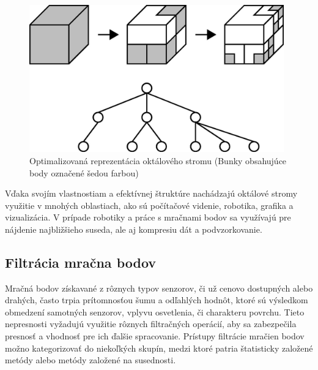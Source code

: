 \newline\begin{figure}[!htbp]
  \centering
  \includegraphics[width=11cm]{img/oct_tree_part.jpg}
  \caption{Optimalizovaná reprezentácia oktálového stromu (Bunky obsahujúce body označené šedou farbou) \cite{oct_tree}}
  \label{oct_tree2}
\end{figure}
\newline\indent Vďaka svojím vlastnostiam a efektívnej štruktúre nachádzajú oktálové stromy využitie v mnohých oblastiach, ako sú počítačové videnie, robotika, grafika a vizualizácia. V prípade robotiky a práce s mračnami bodov sa využívajú pre nájdenie najbližšieho suseda, ale aj kompresiu dát a podvzorkovanie.

\subsection{Filtrácia mračna bodov}
\noindent Mračná bodov získavané z rôznych typov senzorov, či už cenovo dostupných alebo drahých, často trpia prítomnosťou šumu a odľahlých hodnôt, ktoré sú výsledkom obmedzení samotných senzorov, vplyvu osvetlenia, či charakteru povrchu. Tieto nepresnosti vyžadujú využitie rôznych filtračných operácií, aby sa zabezpečila presnosť a vhodnosť pre ich ďalšie spracovanie. Prístupy filtrácie mračien bodov možno kategorizovať do niekoľkých skupín, medzi ktoré patria štatisticky založené metódy alebo metódy založené na susednosti. \cite{point_cloud_filtering}

